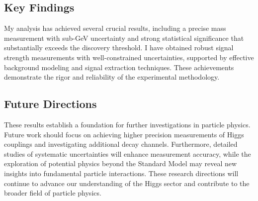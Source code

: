 \documentclass{article}
\begin{document}
\subsection{Key Findings}
My analysis has achieved several crucial results, including a precise mass measurement with sub-GeV uncertainty and strong statistical significance that substantially exceeds the discovery threshold. I have obtained robust signal strength measurements with well-constrained uncertainties, supported by effective background modeling and signal extraction techniques. These achievements demonstrate the rigor and reliability of the experimental methodology.

\subsection{Future Directions}
These results establish a foundation for further investigations in particle physics. Future work should focus on achieving higher precision measurements of Higgs couplings and investigating additional decay channels. Furthermore, detailed studies of systematic uncertainties will enhance measurement accuracy, while the exploration of potential physics beyond the Standard Model may reveal new insights into fundamental particle interactions. These research directions will continue to advance our understanding of the Higgs sector and contribute to the broader field of particle physics.
\end{document}

